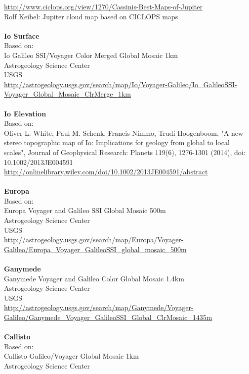 \documentclass[Orbiter User Manual.tex]{subfiles}
\begin{document}
\url{http://www.ciclops.org/view/1270/Cassinis-Best-Maps-of-Jupiter}\\
Rolf Keibel: Jupiter cloud map based on CICLOPS maps\\
\\
\textbf{Io Surface}\\
Based on:\\
Io Galileo SSI/Voyager Color Merged Global Mosaic 1km\\
Astrogeology Science Center\\
USGS\\
\url{http://astrogeology.usgs.gov/search/map/Io/Voyager-Galileo/Io_GalileoSSI-Voyager_Global_Mosaic_ClrMerge_1km}\\
\\
\textbf{Io Elevation}\\
Based on:\\
Oliver L. White, Paul M. Schenk, Francis Nimmo, Trudi Hoogenboom, "A new stereo topographic map of Io: Implications for geology from global to local scales", Journal of Geophysical Research: Planets 119(6), 1276-1301 (2014), doi: 10.1002/2013JE004591\\
\url{http://onlinelibrary.wiley.com/doi/10.1002/2013JE004591/abstract}\\
\\
\textbf{Europa}\\
Based on:\\
Europa Voyager and Galileo SSI Global Mosaic 500m\\
Astrogeology Science Center\\
USGS\\
\url{http://astrogeology.usgs.gov/search/map/Europa/Voyager-Galileo/Europa_Voyager_GalileoSSI_global_mosaic_500m}\\
\\
\textbf{Ganymede}\\
Ganymede Voyager and Galileo Color Global Mosaic 1.4km\\
Astrogeology Science Center\\
USGS\\
\url{http://astrogeology.usgs.gov/search/map/Ganymede/Voyager-Galileo/Ganymede_Voyager_GalileoSSI_Global_ClrMosaic_1435m}\\
\\
\textbf{Callisto}\\
Based on:\\
Callisto Galileo/Voyager Global Mosaic 1km\\
Astrogeology Science Center\\
\end{document}

